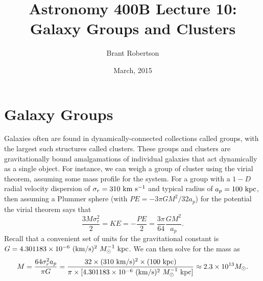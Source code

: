 \documentclass[]{article}
\title{Astronomy 400B Lecture 10: Galaxy Groups and Clusters}
\author{Brant Robertson}
\date{March, 2015}
\begin{document}
\maketitle

\section{Galaxy Groups}

Galaxies often are found in dynamically-connected
collections called groups, with the largest such
structures called clusters. These groups and
clusters are gravitationally bound amalgamations
of individual galaxies that act dynamically as
a single object.  For instance, we can weigh
a group of cluster using the virial theorem,
assuming some mass profile for the system.  For
a group with a $1-D$ radial
velocity dispersion of $\sigma_r =310~\mathrm{km}~\mathrm{s}^{-1}$
and typical radius of $a_p=100~\mathrm{kpc}$, then assuming
a Plummer sphere (with $PE = -3\pi G M^2/32a_p$) for the potential the 
virial theorem says that
\begin{equation}
\frac{3M\sigma_r^2}{2} = KE = -\frac{PE}{2} = \frac{3\pi}{64}\frac{GM^2}{a_p}.
\end{equation}
\noindent
Recall that a convenient set of units for the gravitational
constant is $G=4.301183\times10^{-6}~(\mathrm{km}/\mathrm{s})^2~M_{\odot}^{-1}~\mathrm{kpc}$.
We can then solve for the mass as
\begin{equation}
M = \frac{64\sigma_r^2 a_p}{\pi G} = \frac{32\times(310~\mathrm{km}/\mathrm{s})^2\times(100~\mathrm{kpc})}{\pi \times [4.301183\times10^{-6}~(\mathrm{km}/\mathrm{s})^2~M_{\odot}^{-1}~\mathrm{kpc}]} \approx 2.3\times10^{13}M_{\odot}.
\end{equation}
\end{document}
